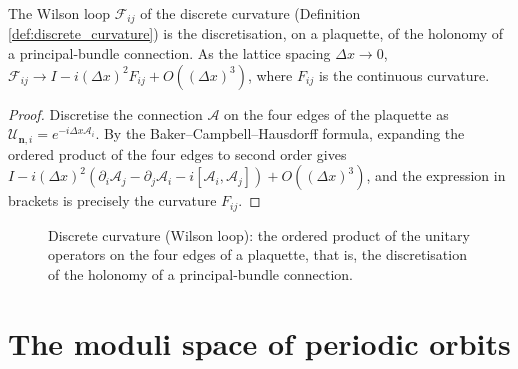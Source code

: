 \begin{proposition}\label{prop:wilson_holonomy}
The Wilson loop $\mathcal{F}_{ij}$ of the discrete curvature (Definition \ref{def:discrete_curvature}) is the discretisation, on a plaquette, of the holonomy of a principal-bundle connection. As the lattice spacing $\Delta x\to 0$, $\mathcal{F}_{ij}\to I-i(\Delta x)^2 F_{ij}+O((\Delta x)^3)$, where $F_{ij}$ is the continuous curvature.
\end{proposition}

\begin{proof}
Discretise the connection $\mathcal{A}$ on the four edges of the plaquette as $\mathcal{U}_{\mathbf{n},i}=e^{-i\Delta x\mathcal{A}_i}$. By the Baker--Campbell--Hausdorff formula, expanding the ordered product of the four edges to second order gives $I-i(\Delta x)^2(\partial_i\mathcal{A}_j-\partial_j\mathcal{A}_i-i[\mathcal{A}_i,\mathcal{A}_j])+O((\Delta x)^3)$, and the expression in brackets is precisely the curvature $F_{ij}$.
\end{proof}

\begin{figure}[htbp]
\centering
{}
\caption{Discrete curvature (Wilson loop): the ordered product of the unitary operators on the four edges of a plaquette, that is, the discretisation of the holonomy of a principal-bundle connection.}
\label{fig:wilson_loop}
\end{figure}

\section{The moduli space of periodic orbits}\label{sec:periodic_orbit_moduli}

